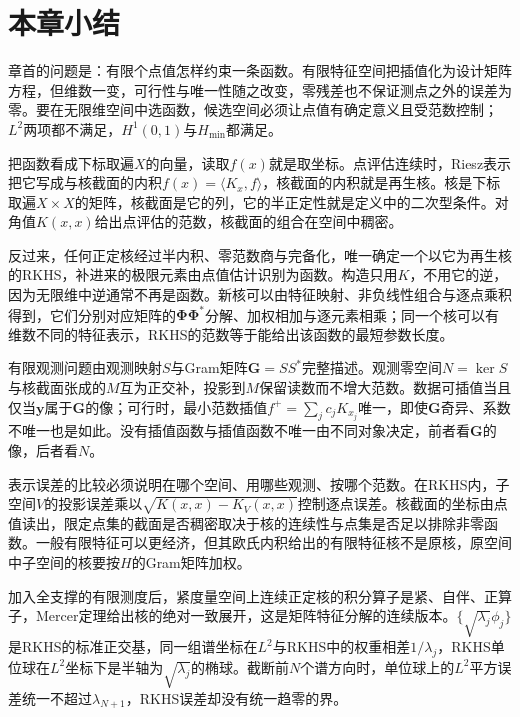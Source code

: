 \section{本章小结}
\label{sec:rkhs-summary}

章首的问题是：有限个点值怎样约束一条函数。有限特征空间把插值化为设计矩阵方程，但维数一变，可行性与唯一性随之改变，零残差也不保证测点之外的误差为零。要在无限维空间中选函数，候选空间必须让点值有确定意义且受范数控制；$L^2$两项都不满足，$H^1(0,1)$与$H_{\min}$都满足。

把函数看成下标取遍$X$的向量，读取$f(x)$就是取坐标。点评估连续时，Riesz表示把它写成与核截面的内积$f(x)=\langle K_x,f\rangle$，核截面的内积就是再生核。核是下标取遍$X\times X$的矩阵，核截面是它的列，它的半正定性就是定义中的二次型条件。对角值$K(x,x)$给出点评估的范数，核截面的组合在空间中稠密。

反过来，任何正定核经过半内积、零范数商与完备化，唯一确定一个以它为再生核的RKHS，补进来的极限元素由点值估计识别为函数。构造只用$K$，不用它的逆，因为无限维中逆通常不再是函数。新核可以由特征映射、非负线性组合与逐点乘积得到，它们分别对应矩阵的$\bm\Phi\bm\Phi^*$分解、加权相加与逐元素相乘；同一个核可以有维数不同的特征表示，RKHS的范数等于能给出该函数的最短参数长度。

有限观测问题由观测映射$S$与Gram矩阵$\bm G=SS^*$完整描述。观测零空间$N=\ker S$与核截面张成的$M$互为正交补，投影到$M$保留读数而不增大范数。数据可插值当且仅当$\bm y$属于$\bm G$的像；可行时，最小范数插值$f^+=\sum_jc_jK_{x_j}$唯一，即使$\bm G$奇异、系数不唯一也是如此。没有插值函数与插值函数不唯一由不同对象决定，前者看$\bm G$的像，后者看$N$。

表示误差的比较必须说明在哪个空间、用哪些观测、按哪个范数。在RKHS内，子空间$V$的投影误差乘以$\sqrt{K(x,x)-K_V(x,x)}$控制逐点误差。核截面的坐标由点值读出，限定点集的截面是否稠密取决于核的连续性与点集是否足以排除非零函数。一般有限特征可以更经济，但其欧氏内积给出的有限特征核不是原核，原空间中子空间的核要按$H$的Gram矩阵加权。

加入全支撑的有限测度后，紧度量空间上连续正定核的积分算子是紧、自伴、正算子，Mercer定理给出核的绝对一致展开，这是矩阵特征分解的连续版本。$\{\sqrt{\lambda_j}\phi_j\}$是RKHS的标准正交基，同一组谱坐标在$L^2$与RKHS中的权重相差$1/\lambda_j$，RKHS单位球在$L^2$坐标下是半轴为$\sqrt{\lambda_j}$的椭球。截断前$N$个谱方向时，单位球上的$L^2$平方误差统一不超过$\lambda_{N+1}$，RKHS误差却没有统一趋零的界。
